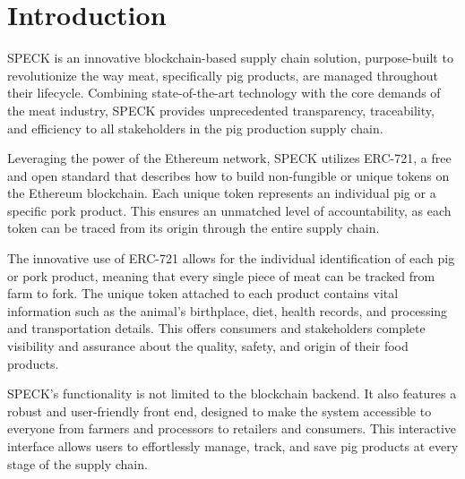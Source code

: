 \documentclass[oneside,a4paper,12pt, colorinlistoftodos]{article} %
\begin{document}
\setlanguageEnglish




\clearpage

\section{Introduction}


SPECK is an innovative blockchain-based supply chain solution, purpose-built to revolutionize the way meat, specifically pig products, are managed throughout their lifecycle. Combining state-of-the-art technology with the core demands of the meat industry, SPECK provides unprecedented transparency, traceability, and efficiency to all stakeholders in the pig production supply chain.

Leveraging the power of the Ethereum network, SPECK utilizes ERC-721, a free and open standard that describes how to build non-fungible or unique tokens on the Ethereum blockchain. Each unique token represents an individual pig or a specific pork product. This ensures an unmatched level of accountability, as each token can be traced from its origin through the entire supply chain.

The innovative use of ERC-721 allows for the individual identification of each pig or pork product, meaning that every single piece of meat can be tracked from farm to fork. The unique token attached to each product contains vital information such as the animal's birthplace, diet, health records, and processing and transportation details. This offers consumers and stakeholders complete visibility and assurance about the quality, safety, and origin of their food products.

SPECK's functionality is not limited to the blockchain backend. It also features a robust and user-friendly front end, designed to make the system accessible to everyone from farmers and processors to retailers and consumers. This interactive interface allows users to effortlessly manage, track, and save pig products at every stage of the supply chain.
\end{document}
